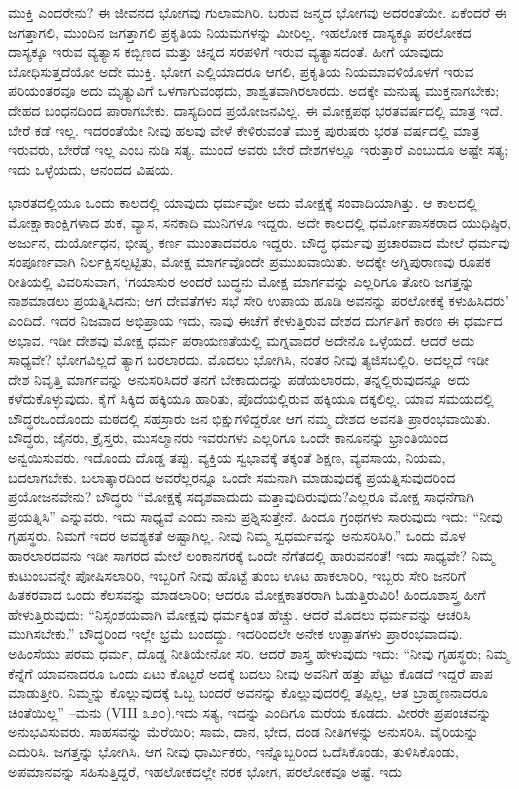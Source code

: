 ಮುಕ್ತಿ ಎಂದರೇನು? ಈ ಜೀವನದ ಭೋಗವು ಗುಲಾಮಗಿರಿ. ಬರುವ ಜನ್ಮದ ಭೋಗವು ಅದರಂತೆಯೇ. ಏಕೆಂದರೆ ಈ ಜಗತ್ತಾಗಲಿ, ಮುಂದಿನ ಜಗತ್ತಾಗಲಿ ಪ್ರಕೃತಿಯ ನಿಯಮಗಳನ್ನು ಮೀರಿಲ್ಲ. ಇಹಲೋಕ ದಾಸ್ಯಕ್ಕೂ ಪರಲೋಕದ ದಾಸ್ಯಕ್ಕೂ ಇರುವ ವ್ಯತ್ಯಾಸ ಕಬ್ಬಿಣದ ಮತ್ತು ಚಿನ್ನದ ಸರಪಳಿಗೆ ಇರುವ ವ್ಯತ್ಯಾಸದಂತೆ. ಹೀಗೆ ಯಾವುದು ಬೋಧಿಸುತ್ತದೆಯೋ ಅದೇ ಮುಕ್ತಿ. ಭೋಗ ಎಲ್ಲಿಯಾದರೂ ಆಗಲಿ, ಪ್ರಕೃತಿಯ ನಿಯಮಾ\break ವಳಿಯೊಳಗೆ ಇರುವ ಪರಿಯಂತರವೂ ಅದು ಮೃತ್ಯುವಿಗೆ ಒಳಗಾಗುವಂಥದು, ಶಾಶ್ವತ\break ವಾಗಿರಲಾರದು. ಅದಕ್ಕೇ ಮನುಷ್ಯ ಮುಕ್ತನಾಗಬೇಕು; ದೇಹದ ಬಂಧನದಿಂದ ಪಾರಾಗಬೇಕು. ದಾಸ್ಯದಿಂದ ಪ್ರಯೋಜನವಿಲ್ಲ. ಈ ಮೋಕ್ಷಪಥ ಭರತವರ್ಷದಲ್ಲಿ ಮಾತ್ರ ಇದೆ. ಬೇರೆ ಕಡೆ ಇಲ್ಲ. ಇದರಂತೆಯೇ ನೀವು ಹಲವು ವೇಳೆ ಕೇಳಿರುವಂತೆ ಮುಕ್ತ ಪುರುಷರು ಭರತ ವರ್ಷದಲ್ಲಿ ಮಾತ್ರ ಇರುವರು, ಬೇರೆಡೆ ಇಲ್ಲ ಎಂಬ ನುಡಿ ಸತ್ಯ. ಮುಂದೆ ಅವರು ಬೇರೆ ದೇಶಗಳಲ್ಲೂ ಇರುತ್ತಾರೆ ಎಂಬುದೂ ಅಷ್ಟೇ ಸತ್ಯ; ಇದು ಒಳ್ಳೆಯದು, ಆನಂದದ ವಿಷಯ.

ಭಾರತದಲ್ಲಿಯೂ ಒಂದು ಕಾಲದಲ್ಲಿ ಯಾವುದು ಧರ್ಮವೋ ಅದು ಮೋಕ್ಷಕ್ಕೆ ಸಂವಾದಿಯಾಗಿತ್ತು. ಆ ಕಾಲದಲ್ಲಿ ಮೋಕ್ಷಾಕಾಂಕ್ಷಿಗಳಾದ ಶುಕ, ವ್ಯಾಸ, ಸನಕಾದಿ ಮುನಿ\-ಗಳೂ ಇದ್ದರು. ಅದೇ ಕಾಲದಲ್ಲಿ ಧರ್ಮೋಪಾಸಕರಾದ ಯುಧಿಷ್ಠಿರ, ಅರ್ಜುನ, ದುರ್ಯೋ\break ಧನ, ಭೀಷ್ಮ, ಕರ್ಣ ಮುಂತಾದವರೂ ಇದ್ದರು. ಬೌದ್ಧ ಧರ್ಮವು ಪ್ರಚಾರವಾದ ಮೇಲೆ ಧರ್ಮವು ಸಂಪೂರ್ಣವಾಗಿ ನಿರ್ಲಕ್ಷಿಸಲ್ಪಟ್ಟಿತು, ಮೋಕ್ಷ ಮಾರ್ಗವೊಂದೇ ಪ್ರಮುಖ\break ವಾಯಿತು. ಅದಕ್ಕೇ ಅಗ್ನಿಪುರಾಣವು ರೂಪಕ ರೀತಿಯಲ್ಲಿ ವಿವರಿಸುವಾಗ, ‘ಗಯಾಸುರ ಅಂದರೆ ಬುದ್ಧನು ಮೋಕ್ಷ ಮಾರ್ಗವನ್ನು ಎಲ್ಲರಿಗೂ ತೋರಿ ಜಗತ್ತನ್ನು ನಾಶಮಾಡಲು ಪ್ರಯತ್ನಿಸಿದನು; ಆಗ ದೇವತೆಗಳು ಸಭೆ ಸೇರಿ ಉಪಾಯ ಹೂಡಿ ಅವನನ್ನು ಪರಲೋಕಕ್ಕೆ ಕಳುಹಿಸಿದರು’ ಎಂದಿದೆ. ಇದರ ನಿಜವಾದ ಅಭಿಪ್ರಾಯ ಇದು, ನಾವು ಈಚೆಗೆ ಕೇಳುತ್ತಿರುವ ದೇಶದ ದುರ್ಗತಿಗೆ ಕಾರಣ ಈ ಧರ್ಮದ ಅಭಾವ. ಇಡೀ ದೇಶವು ಮೋಕ್ಷ ಧರ್ಮ ಪರಾಯಣತೆಯಲ್ಲಿ ಮಗ್ನವಾದರೆ ಅದೇನೊ ಒಳ್ಳೆಯದೆ. ಆದರೆ ಅದು ಸಾಧ್ಯವೇ? ಭೋಗವಿಲ್ಲದೆ ತ್ಯಾಗ ಬರಲಾರದು. ಮೊದಲು ಭೋಗಿಸಿ, ನಂತರ ನೀವು ತ್ಯಜಿಸಬಲ್ಲಿರಿ. ಅದಲ್ಲದೆ ಇಡೀ ದೇಶ ನಿವೃತ್ತಿ ಮಾರ್ಗವನ್ನು ಅನುಸರಿಸಿದರೆ ತನಗೆ ಬೇಕಾದುದನ್ನು ಪಡೆಯಲಾರದು, ತನ್ನಲ್ಲಿರುವುದನ್ನೂ ಅದು ಕಳೆದುಕೊಳ್ಳುವುದು. ಕೈಗೆ ಸಿಕ್ಕಿದ ಹಕ್ಕಿಯೂ ಹಾರಿತು, ಪೊದೆಯಲ್ಲಿರುವ ಹಕ್ಕಿಯೂ ದಕ್ಕಲಿಲ್ಲ. ಯಾವ ಸಮಯದಲ್ಲಿ ಬೌದ್ಧರ\break ಒಂದೊಂದು ಮಠದಲ್ಲಿ ಸಹಸ್ರಾರು ಜನ ಭಿಕ್ಷುಗಳಿದ್ದರೋ ಆಗ ನಮ್ಮ ದೇಶದ ಅವನತಿ ಪ್ರಾರಂಭವಾಯಿತು. ಬೌದ್ಧರು, ಜೈನರು, ಕ್ರೈಸ್ತರು, ಮುಸಲ್ಮಾನರು ಇವರುಗಳು ಎಲ್ಲರಿಗೂ ಒಂದೇ ಕಾನೂನನ್ನು ಭ್ರಾಂತಿಯಿಂದ ಅನ್ವಯಿಸುವರು. ಇದೊಂದು ದೊಡ್ಡ ತಪ್ಪು. ವ್ಯಕ್ತಿಯ ಸ್ವಭಾವಕ್ಕೆ ತಕ್ಕಂತೆ ಶಿಕ್ಷಣ, ವ್ಯವಸಾಯ, ನಿಯಮ, ಬದಲಾಗಬೇಕು. ಬಲಾತ್ಕಾರದಿಂದ ಅವರೆಲ್ಲರನ್ನೂ ಒಂದೇ ಸಮನಾಗಿ ಮಾಡುವುದಕ್ಕೆ ಪ್ರಯತ್ನಿಸುವುದರಿಂದ ಪ್ರಯೋಜನವೇನು? ಬೌದ್ಧರು “ಮೋಕ್ಷಕ್ಕೆ ಸದೃಶವಾದುದು ಮತ್ತಾವುದಿರುವುದು?\break ಎಲ್ಲರೂ ಮೋಕ್ಷ ಸಾಧನೆಗಾಗಿ ಪ್ರಯತ್ನಿಸಿ” ಎನ್ನುವರು. ಇದು ಸಾಧ್ಯವೆ ಎಂದು ನಾನು ಪ್ರಶ್ನಿಸುತ್ತೇನೆ. ಹಿಂದೂ ಗ್ರಂಥಗಳು ಸಾರುವುದು ಇದು: “ನೀವು ಗೃಹಸ್ಥರು. ನಿಮಗೆ ಇದರ ಅವಶ್ಯಕತೆ ಅಷ್ಟಾಗಿಲ್ಲ. ನೀವು ನಿಮ್ಮ ಸ್ವಧರ್ಮವನ್ನು ಅನುಸರಿಸಿರಿ.” ಒಂದು ಮೊಳ ಹಾರಲಾರದವನು ಇಡೀ ಸಾಗರದ ಮೇಲೆ ಲಂಕಾನಗರಕ್ಕೆ ಒಂದೇ ನೆಗೆತದಲ್ಲಿ ಹಾರುವನಂತೆ! ಇದು ಸಾಧ್ಯವೇ? ನಿಮ್ಮ ಕುಟುಂಬವನ್ನೇ ಪೋಷಿಸಲಾರಿರಿ, ಇಬ್ಬರಿಗೆ ನೀವು ಹೊಟ್ಟೆ ತುಂಬ ಊಟ ಹಾಕಲಾರಿರಿ, ಇಬ್ಬರು ಸೇರಿ ಜನರಿಗೆ ಹಿತಕರವಾದ ಒಂದು ಕೆಲಸವನ್ನು ಮಾಡಲಾರಿರಿ; ಆದರೂ ಮೋಕ್ಷಕಾತರರಾಗಿ ಓಡುತ್ತಿರುವಿರಿ! ಹಿಂದೂಶಾಸ್ತ್ರ ಹೀಗೆ ಹೇಳುತ್ತಿರುವುದು: “ನಿಸ್ಸಂಶಯವಾಗಿ ಮೋಕ್ಷವು ಧರ್ಮಕ್ಕಿಂತ ಹೆಚ್ಚು. ಆದರೆ ಮೊದಲು ಧರ್ಮವನ್ನು ಆಚರಿಸಿ ಮುಗಿಸಬೇಕು.” ಬೌದ್ಧರಿಂದ ಇಲ್ಲೇ ಭ್ರಮೆ ಬಂದದ್ದು. ಇದರಿಂದಲೇ ಅನೇಕ ಉತ್ಪಾತಗಳು ಪ್ರಾರಂಭವಾದವು. ಅಹಿಂಸೆಯು ಪರಮ ಧರ್ಮ, ದೊಡ್ಡ ನೀತಿಯೇನೋ ಸರಿ. ಆದರೆ ಶಾಸ್ತ್ರ ಹೇಳುವುದು ಇದು: “ನೀವು ಗೃಹಸ್ಥರು; ನಿಮ್ಮ ಕೆನ್ನೆಗೆ ಯಾವನಾದರೂ ಒಂದು ಏಟು ಕೊಟ್ಟರೆ ಅದಕ್ಕೆ ಬದಲು ನೀವು ಅವನಿಗೆ ಹತ್ತು ಪೆಟ್ಟು ಕೊಡದೆ ಇದ್ದರೆ ಪಾಪ ಮಾಡುತ್ತೀರಿ. ನಿಮ್ಮನ್ನು ಕೊಲ್ಲುವುದಕ್ಕೆ ಒಬ್ಬ ಬಂದರೆ ಅವನನ್ನು ಕೊಲ್ಲುವುದರಲ್ಲಿ ತಪ್ಪಿಲ್ಲ, ಆತ ಬ್ರಾಹ್ಮಣನಾದರೂ ಚಿಂತೆಯಿಲ್ಲ” –ಮನು (VIII ೩೨೦).ಇದು ಸತ್ಯ, ಇದನ್ನು ಎಂದಿಗೂ ಮರೆಯ ಕೂಡದು. ವೀರರೇ ಪ್ರಪಂಚವನ್ನು ಅನುಭವಿಸುವರು. ಸಾಹಸವನ್ನು ಮೆರೆಯಿರಿ; ಸಾಮ, ದಾನ, ಭೇದ, ದಂಡ ನೀತಿಗಳನ್ನು ಅನುಸರಿಸಿ. ವೈರಿಯನ್ನು ಎದುರಿಸಿ. ಜಗತ್ತನ್ನು ಭೋಗಿಸಿ. ಆಗ ನೀವು ಧಾರ್ಮಿಕರು, ಇನ್ನೊಬ್ಬರಿಂದ ಒದೆಸಿಕೊಂಡು, ತುಳಿಸಿಕೊಂಡು, ಅಪಮಾನವನ್ನು ಸಹಿಸುತ್ತಿದ್ದರೆ, ಇಹಲೋಕದಲ್ಲೇ ನರಕ ಭೋಗ, ಪರಲೋಕವೂ ಅಷ್ಟೆ. ಇದು 